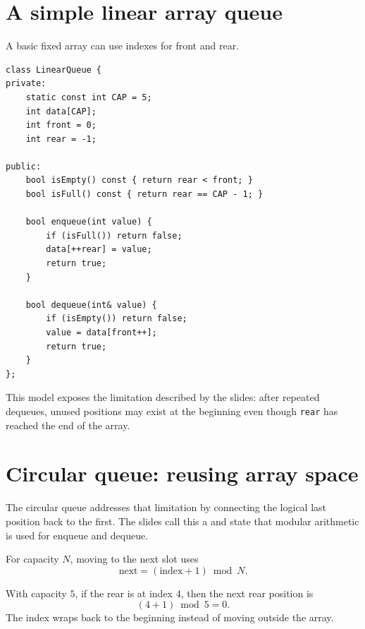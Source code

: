 \section{A simple linear array queue}

A basic fixed array can use indexes for front and rear.

\begin{lstlisting}
class LinearQueue {
private:
    static const int CAP = 5;
    int data[CAP];
    int front = 0;
    int rear = -1;

public:
    bool isEmpty() const { return rear < front; }
    bool isFull() const { return rear == CAP - 1; }

    bool enqueue(int value) {
        if (isFull()) return false;
        data[++rear] = value;
        return true;
    }

    bool dequeue(int& value) {
        if (isEmpty()) return false;
        value = data[front++];
        return true;
    }
};
\end{lstlisting}

This model exposes the limitation described by the slides: after repeated dequeues, unused positions may exist at the beginning even though \texttt{rear} has reached the end of the array.

\section{Circular queue: reusing array space}

The circular queue addresses that limitation by connecting the logical last position back to the first. The slides call this a  and state that modular arithmetic is used for enqueue and dequeue.

\begin{mlfigure}
\end{mlfigure}

For capacity $N$, moving to the next slot uses
\[
\text{next} = (\text{index}+1) \bmod N.
\]

\begin{workedexample}
With capacity $5$, if the rear is at index $4$, then the next rear position is
\[
(4+1) \bmod 5 = 0.
\]
The index wraps back to the beginning instead of moving outside the array.
\end{workedexample}

